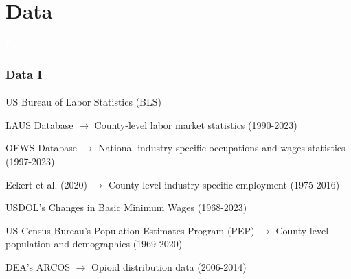 

\section{Data}

\begin{transitionframe}

    \rmfamily %
    
    \begin{center}
    {\Huge \textbf{\textcolor{white}{Data}}}
    \end{center}
  
\end{transitionframe}

\begin{frame}

    \frametitle{Data I} %
    \framesubtitle{}  %
    \rmfamily %

    \begin{wideitemize}
        \item \textcolor{fgre}{US Bureau of Labor Statistics (BLS)}  
        \vspace{9pt}
        \begin{wideitemize}
            \item[\textcolor{fgre}{\textbullet}] \textcolor{fgre}{LAUS Database} \(\to\) County-level labor market statistics (1990-2023)
            \item[\textcolor{fgre}{\textbullet}] \textcolor{fgre}{OEWS Database} \(\to\) National industry-specific occupations and wages statistics (1997-2023) %
        \end{wideitemize}
        \item \textcolor{fgre}{Eckert et al. (2020)} \(\to\) County-level industry-specific employment (1975-2016) 
        \item \textcolor{fgre}{USDOL's Changes in Basic Minimum Wages} (1968-2023)
        \item \textcolor{fgre}{US Census Bureau's Population Estimates Program (PEP)} \(\to\) County-level population and demographics (1969-2020)
        \item \textcolor{fgre}{DEA's ARCOS} \(\to\) Opioid distribution data (2006-2014)
    \end{wideitemize}

\end{frame}


